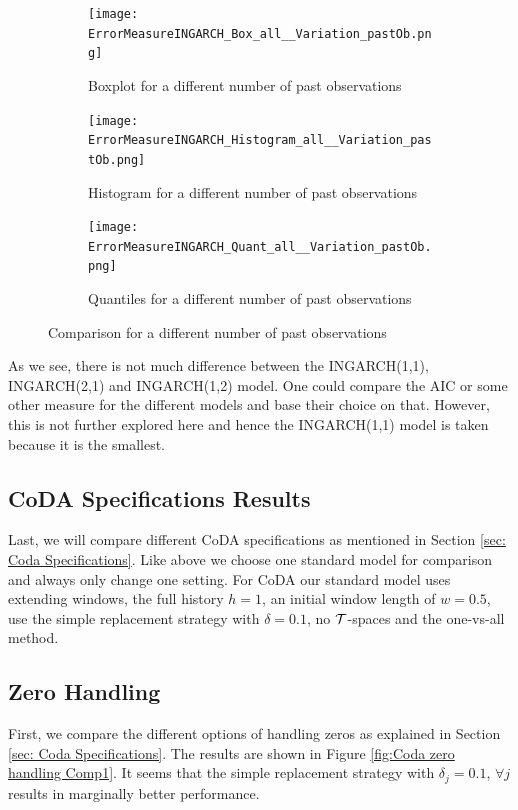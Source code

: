 \begin{figure}[htb!]
\centering
\begin{subfigure}[b]{0.45\textwidth}
\texttt{[image: ErrorMeasureINGARCH\_Box\_all\_\_Variation\_pastOb.png]}
\caption{Boxplot for a different number of past observations}
\label{fig:past obs Box}
\end{subfigure}
\hfill
\begin{subfigure}[b]{0.45\textwidth}
\texttt{[image: ErrorMeasureINGARCH\_Histogram\_all\_\_Variation\_pastOb.png]}
\caption{Histogram for a different number of past observations}
\label{fig:past obs Hist}
\end{subfigure}
\hfill
\begin{subfigure}[b]{0.8\textwidth}
\texttt{[image: ErrorMeasureINGARCH\_Quant\_all\_\_Variation\_pastOb.png]}
\caption{Quantiles for a different number of past observations}
\label{fig:past obs Quant}
\end{subfigure}
\caption{Comparison for a different number of past observations}
\label{fig:past obs Comp1}
\end{figure}

As we see, there is not much difference between the INGARCH(1,1), INGARCH(2,1) and INGARCH(1,2) model. One could compare the AIC or some other measure for the different models and base their choice on that. However, this is not further explored here and hence the INGARCH(1,1) model is taken because it is the smallest.

\subsection{CoDA Specifications Results}
\label{sec: CoDA Specifications Results}

Last, we will compare different CoDA specifications as mentioned in Section \ref{sec: Coda Specifications}. Like above we choose one standard model for comparison and always only change one setting. For CoDA our standard model uses extending windows, the full history $h=1$, an initial window length of $w=0.5$, use the simple replacement strategy with $\delta=0.1$, no $\mathcal{T}$-spaces and the one-vs-all method. 

\subsection{Zero Handling}
\label{sec: Zero Handling}

First, we compare the different options of handling zeros as explained in Section \ref{sec: Coda Specifications}. The results are shown in Figure \ref{fig:Coda zero handling Comp1}. It seems that the simple replacement strategy with $\delta_j = 0.1$, $\forall j$ results in marginally better performance.

